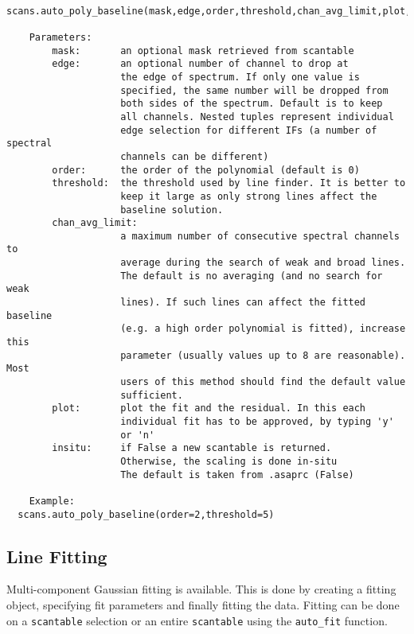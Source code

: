 \small
\begin{verbatim}
  scans.auto_poly_baseline(mask,edge,order,threshold,chan_avg_limit,plot,insitu):

    Parameters:
        mask:       an optional mask retrieved from scantable
        edge:       an optional number of channel to drop at
                    the edge of spectrum. If only one value is
                    specified, the same number will be dropped from
                    both sides of the spectrum. Default is to keep
                    all channels. Nested tuples represent individual
                    edge selection for different IFs (a number of spectral
                    channels can be different)
        order:      the order of the polynomial (default is 0)
        threshold:  the threshold used by line finder. It is better to
                    keep it large as only strong lines affect the
                    baseline solution.
        chan_avg_limit:
                    a maximum number of consecutive spectral channels to
                    average during the search of weak and broad lines.
                    The default is no averaging (and no search for weak
                    lines). If such lines can affect the fitted baseline
                    (e.g. a high order polynomial is fitted), increase this
                    parameter (usually values up to 8 are reasonable). Most
                    users of this method should find the default value
                    sufficient.
        plot:       plot the fit and the residual. In this each
                    individual fit has to be approved, by typing 'y'
                    or 'n'
        insitu:     if False a new scantable is returned.
                    Otherwise, the scaling is done in-situ
                    The default is taken from .asaprc (False)

    Example:
  scans.auto_poly_baseline(order=2,threshold=5)
\end{verbatim}
\normalsize


\subsection{Line Fitting}
\label{subsection:sd.asap.LINEfitting}

Multi-component Gaussian fitting is available. This is done by
creating a fitting object, specifying fit parameters and finally
fitting the data. Fitting can be done on a {\tt scantable} selection
or an entire {\tt scantable} using the {\tt auto\_fit} function.

